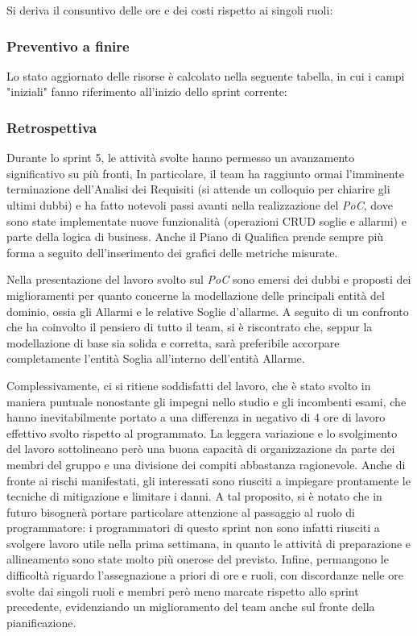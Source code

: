 \documentclass[10pt, letterpaper]{article}
\begin{document}
Si deriva il consuntivo delle ore e dei costi rispetto ai singoli ruoli:

\subsubsection{Preventivo a finire}
Lo stato aggiornato delle risorse è calcolato nella seguente tabella, in cui i campi "iniziali" fanno riferimento all'inizio dello sprint corrente:


\subsubsection{Retrospettiva}
Durante lo sprint 5, le attività svolte hanno permesso un avanzamento significativo su più fronti,
In particolare, il team ha raggiunto ormai l'imminente terminazione dell'Analisi dei Requisiti (si attende un colloquio per chiarire gli ultimi dubbi)
e ha fatto notevoli passi avanti nella realizzazione del \textit{PoC}, dove sono state implementate nuove funzionalità (operazioni CRUD soglie e allarmi) e parte della logica di business. Anche il Piano di Qualifica
prende sempre più forma a seguito dell'inserimento dei grafici delle metriche misurate.


Nella presentazione del lavoro svolto sul \textit{PoC} sono emersi dei dubbi e proposti dei miglioramenti
per quanto concerne la modellazione delle principali entità del dominio, ossia gli Allarmi e le relative Soglie d'allarme.
A seguito di un confronto che ha coinvolto il pensiero di tutto il team, si è riscontrato che, seppur la modellazione di base sia solida e corretta,
sarà preferibile accorpare completamente l'entità Soglia all'interno dell'entità Allarme.

Complessivamente, ci si ritiene soddisfatti del lavoro, che è stato svolto in maniera puntuale nonostante
gli impegni nello studio e gli incombenti esami, che hanno inevitabilmente portato a una differenza in negativo di 4 ore di lavoro effettivo svolto rispetto al programmato.
La leggera variazione e lo svolgimento del lavoro sottolineano però una buona capacità di organizzazione da parte dei membri del gruppo
e una divisione dei compiti abbastanza ragionevole.
Anche di fronte ai rischi manifestati, gli interessati sono riusciti a impiegare prontamente le tecniche di mitigazione e limitare i danni.
A tal proposito, si è notato che in futuro bisognerà portare particolare attenzione al passaggio al ruolo di programmatore: i programmatori di questo sprint
non sono infatti riusciti a svolgere lavoro utile nella prima settimana, in quanto le attività di preparazione e allineamento sono state molto più onerose del previsto.
Infine, permangono le difficoltà riguardo l'assegnazione a priori di ore e ruoli, con discordanze nelle ore svolte dai singoli ruoli e membri però meno marcate rispetto allo sprint precedente,
evidenziando un miglioramento del team anche sul fronte della pianificazione.
\end{document}
